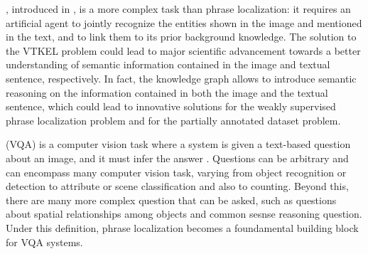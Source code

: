 , introduced in
, is a more complex task than phrase
localization: it requires an artificial agent to jointly recognize the
entities shown in the image and mentioned in the text, and to link
them to its prior background knowledge. The solution to the VTKEL
problem could lead to major scientific advancement towards a better
understanding of semantic information contained in the image and
textual sentence, respectively. In fact, the knowledge graph allows to
introduce semantic reasoning on the information contained in both the
image and the textual sentence, which could lead to innovative
solutions for the weakly supervised phrase localization problem and
for the partially annotated dataset problem.

 (VQA) is a computer vision task
where a system is given a text-based question about an image, and it
must infer the answer . Questions can be
arbitrary and can encompass many computer vision task, varying from
object recognition or detection to attribute or scene classification
and also to counting. Beyond this, there are many more complex
question that can be asked, such as questions about spatial
relationships among objects and common sesnse reasoning question. 
Under this definition, phrase localization becomes a foundamental
building block for VQA systems.

